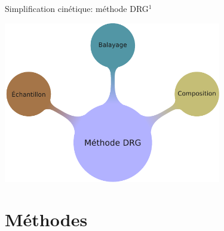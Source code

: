 \documentclass[aspectratio=169,pdf,t]{beamer}
\begin{document}
\begin{frame}{\insertsection}{Simplification cinétique: m\'ethode DRG$^\text{1}$}
 \begin{center}
  	\vspace{-0.5cm}
  	\includegraphics[width=9.5cm]{figures/schema-simplification.pdf}
  	
 \end{center}
\end{frame}


\section{Méthodes}
\end{document}
